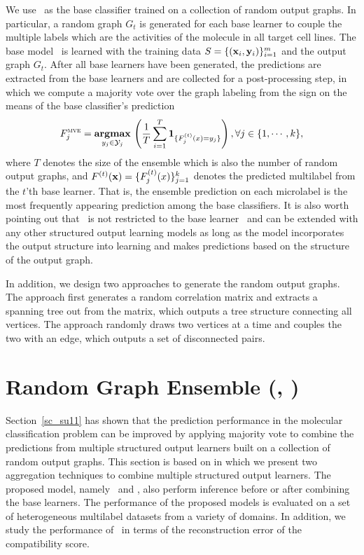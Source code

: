 {We use \mmcrf\ as the base classifier trained on a collection of random output graphs.
In particular, a random graph $G_t$ is generated for each base learner to couple the multiple labels which are the activities of the molecule in all target cell lines.
The base model \mmcrf\ is learned with the training data $S=\{(\mathbf {x}_i,\mathbf {y}_i)\}_{i=1}^{m}$ and the output graph $G_t$.
After all base learners have been generated, the predictions are extracted from the base learners and are collected for a post-processing step, in which we compute a majority vote over the graph labeling from the sign on the means of the base classifier's prediction
\begin{align*}
	F_j^{\text{{\sc mve}}}=\underset{y_j\in\mathcal{Y}_j}{\textbf{argmax}}\,\left(\frac{1}{T}\sum_{i=1}^{T}\mathbf{1}_{\{F_j^{(t)}(x)=y_j\}}\right), \forall j\in\{1,\cdots,k\},
\end{align*}
where $T$ denotes the size of the ensemble which is also the number of random output graphs, and $F^{(t)}(\mathbf {x})=\{F^{(t)}_j(x)\}_{j=1}^{k}$ denotes the predicted multilabel from the $t$'th base learner.
That is, the ensemble prediction on each microlabel is the most frequently appearing prediction among the base classifiers.
It is also worth pointing out that \mve\ is not restricted to the base learner \mmcrf\ and can be extended with any other structured output learning models as long as the model incorporates the output structure into learning and makes predictions based on the structure of the output graph.

In addition, we design two approaches to generate the random output graphs.
The  approach first generates a random correlation matrix and extracts a spanning tree out from the matrix, which outputs a tree structure connecting all vertices.
The  approach randomly draws two vertices at a time and couples the two with an edge, which outputs a set of disconnected pairs.



%
%
\section{Random Graph Ensemble (\amm, \mam)} \label{sc_su14b}

Section~\ref{sc_su11} has shown that the prediction performance in the molecular classification problem can be improved by applying majority vote to combine the predictions from multiple structured output learners built on a collection of random output graphs.
This section is based on  in which we present two aggregation techniques to combine multiple structured output learners. 
The proposed model, namely \amm\ and \mam, also perform inference before or after combining the base learners.
The performance of the proposed models is evaluated on a set of heterogeneous multilabel datasets from a variety of domains.
In addition, we study the performance of \mam\ in terms of the reconstruction error of the compatibility score.



}
